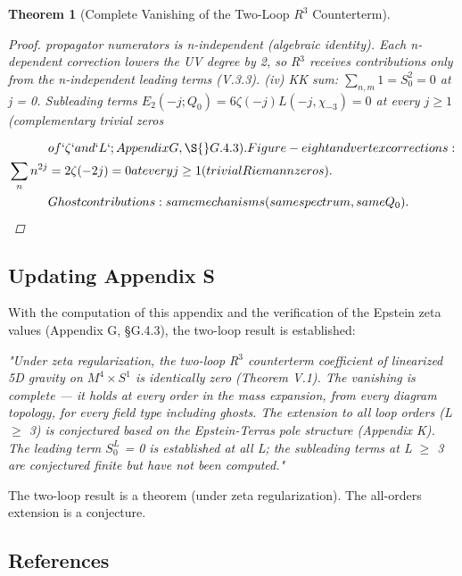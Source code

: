 \documentclass[aps,prd,preprint,superscriptaddress,longbibliography,floatfix]{revtex4-2}
\newtheorem{theorem}{Theorem}[section]
\theoremstyle{remark}
\begin{document}
\begin{theorem}[Complete Vanishing of the Two-Loop $R^{3}$ Counterterm]
\begin{proof}
propagator numerators is n-independent (algebraic identity). Each
n-dependent correction lowers the UV degree by 2, so R$^{3}$ receives
contributions only from the n-independent leading terms (V.3.3).
(iv) KK sum: $\sum_{n,m} 1 = S_{0}^{2} = 0$ at j = 0. Subleading terms $E_{2}(-j; Q_{0}) = 6\zeta(-j)L(-j,\chi_{-3}) = 0$ at every $j \geq 1$ (complementary trivial zeros

\begin{align}
    & of `\zeta` and `L`; Appendix G, \S{}G.4.3). Figure-eight and vertex corrections: \\
    \sum_n n^{2j} &= 2\zeta(-2j) = 0 at every j \geq 1 (trivial Riemann zeros). \\
    & Ghost contributions: same mechanisms (same spectrum, same Q_{0}).
\end{align}
\end{proof}
\end{theorem}




\subsection{Updating Appendix S}

With the computation of this appendix and the verification of the Epstein zeta values (Appendix G, \S{}G.4.3), the two-loop result is established:

\textit{"Under zeta regularization, the two-loop R$^{3}$ counterterm coefficient of linearized 5D gravity on $M^{4} \times S^{1}$ is identically zero (Theorem V.1). The vanishing is complete --- it holds at every order in the mass expansion, from every diagram topology, for every field type including ghosts. The extension to all loop orders (L $\geq$ 3) is conjectured based on the Epstein-Terras pole structure (Appendix K). The leading term $S_{0}^L$ = 0 is established at all L; the subleading terms at L $\geq$ 3 are conjectured finite but have not been computed."}

The two-loop result is a theorem (under zeta regularization). The all-orders extension is a conjecture.



\subsection{References}
\end{document}
